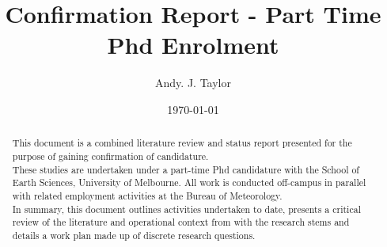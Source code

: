 



\title{Confirmation Report - Part Time Phd Enrolment\\ \TITLE{}}
\author{Andy. J. Taylor}
\date{\today}
\maketitle

\begin{abstract}
\noindent
This document is a combined literature review and status report presented for the purpose of gaining confirmation of candidature.\\
These studies are undertaken under a part-time Phd candidature with the School of Earth Sciences, University of Melbourne.  All work is conducted off-campus in parallel with related employment activities at the Bureau of Meteorology. \\
In summary, this document outlines activities undertaken to date, presents a critical review of the literature and operational context from with the research stems and details a work plan made up of discrete research questions.
\end{abstract}

\newpage
\tableofcontents
\newpage







\appendix


%
%
%
%

% 
% 
% 
% 



